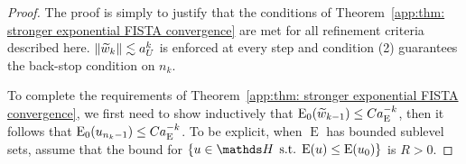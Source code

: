 \documentclass[smallextended]{svjour3}
\let\F\mathds\let\C\mathcal\newcommand{\R}{\F{R}}\newcommand{\A}{\tens{A}}
\newcommand{\norm}[1]{{\left\lVert #1 \right\rVert}}
\newcommand{\op}[1]{\operatorname{#1}}
\newcommand{\1}{\F{1}}
\DeclareMathOperator{\st}{\;s.t.\;}
\newcommand*{\varf}[1]{%
	\IfEqCase{#1}{%
		{0}{u}%
		{1}{v}%
		{2}{w}%
	}[u#1]%
}
\newcommand*{\Varf}[1]{%
	\IfEqCase{#1}{%
		{0}{U}%
		{1}{V}%
		{2}{W}%
	}[u#1]%
}
\newcommand*{\vars}[1]{%
	\IfEqCase{#1}{%
		{0}{\alpha}%
		{1}{\beta}%
		{2}{\gamma}%
		{3}{a}%
		{4}{b}%
		{5}{c}%
	}[k#1]%
}
\begin{document}
	\begin{lemma}\label{app:thm: practical refinement criteria}
	\end{lemma}
	\begin{proof}
		The proof is simply to justify that the conditions of Theorem~\ref{app:thm: stronger exponential FISTA convergence} are met for all refinement criteria described here. $\norm{\tilde{\varf2}_k}\lesssim \vars3_{\Varf0}^k$ is enforced at every step and condition (2) guarantees the back-stop condition on $n_k$.
		
		To complete the requirements of Theorem~\ref{app:thm: stronger exponential FISTA convergence}, we first need to show inductively that $\op{E}_0(\tilde{\varf2}_{k-1}) \leq C\vars3_{\op{E}}^{-k}$, then it follows that $\op{E}_0(\varf0_{n_k-1})\leq C\vars3_{\op{E}}^{-k}$. To be explicit, when $\op{E}$ has bounded sublevel sets, assume that the bound for $\{\varf0\in\F H\st \op{E}(\varf0)\leq \op{E}(\varf0_0)\}$ is $R>0$.
		

\end{proof}
\end{document}
